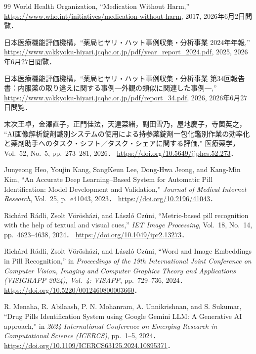 \documentclass[dvipdfmx]{jsarticle}
\begin{document}
\begin{thebibliography}{99}
World Health Organization, ``Medication Without Harm,''
\url{https://www.who.int/initiatives/medication-without-harm}, 2017, 2026年6月2日閲覧．

日本医療機能評価機構，``薬局ヒヤリ・ハット事例収集・分析事業 2024年年報,''
\url{https://www.yakkyoku-hiyari.jcqhc.or.jp/pdf/year_report_2024.pdf}, 2025, 2026年6月27日閲覧．

日本医療機能評価機構，``薬局ヒヤリ・ハット事例収集・分析事業 第34回報告書：内服薬の取り違えに関する事例―外観の類似に関連した事例―,''
\url{https://www.yakkyoku-hiyari.jcqhc.or.jp/pdf/report_34.pdf}, 2026, 2026年6月27日閲覧．

末次王卓，金澤直子，正門佳法，天達菜緒，副田雪乃，屋地慶子，寺薗英之，
``AI画像解析錠剤識別システムの使用による持参薬錠剤一包化鑑別作業の効率化と薬剤助手へのタスク・シフト／タスク・シェアに関する評価,''
医療薬学，Vol.~52, No.~5, pp.~273--281, 2026．
\url{https://doi.org/10.5649/jjphcs.52.273}．

Junyeong Heo, Youjin Kang, SangKeun Lee, Dong-Hwa Jeong, and Kang-Min Kim,
``An Accurate Deep Learning--Based System for Automatic Pill Identification: Model Development and Validation,''
\textit{Journal of Medical Internet Research}, Vol.~25, p.~e41043, 2023．
\url{https://doi.org/10.2196/41043}．

Rich\'{a}rd R\'{a}dli, Zsolt V\"{o}r\"{o}sh\'{a}zi, and L\'{a}szl\'{o} Cz\'{u}ni,
``Metric-based pill recognition with the help of textual and visual cues,''
\textit{IET Image Processing}, Vol.~18, No.~14, pp.~4623--4638, 2024．
\url{https://doi.org/10.1049/ipr2.13273}．

Rich\'{a}rd R\'{a}dli, Zsolt V\"{o}r\"{o}sh\'{a}zi, and L\'{a}szl\'{o} Cz\'{u}ni,
``Word and Image Embeddings in Pill Recognition,''
in \textit{Proceedings of the 19th International Joint Conference on Computer Vision, Imaging and Computer Graphics Theory and Applications (VISIGRAPP 2024), Vol.~4: VISAPP}, pp.~729--736, 2024．
\url{https://doi.org/10.5220/0012460800003660}．

R. Menaha, R. Abilaash, P. N. Mohanram, A. Unnikrishnan, and S. Sukumar,
``Drug Pills Identification System using Google Gemini LLM: A Generative AI approach,''
in \textit{2024 International Conference on Emerging Research in Computational Science (ICERCS)}, pp.~1--5, 2024．
\url{https://doi.org/10.1109/ICERCS63125.2024.10895371}．
\end{thebibliography}
\end{document}
